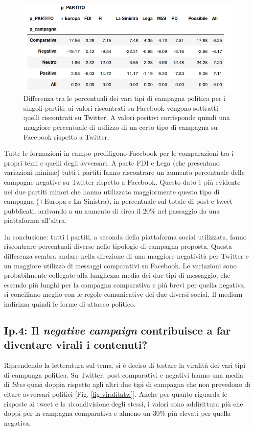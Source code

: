 \begin{figure}
	\includegraphics[width=\textwidth]{figures/partitic}
	\caption{Differenza tra le percentuali dei vari tipi di campagna politica per i singoli partiti: ai valori riscontrati su Facebook vengono sottratti quelli riscontrati su Twitter. A valori positivi corrisponde quindi una maggiore percentuale di utilizzo di un certo tipo di campagna su Facebook rispetto a Twitter.}
	\label{fig:partitic}
\end{figure}

Tutte le formazioni in campo prediligono Facebook per le comparazioni tra i propri temi e quelli degli avversari. A parte FDI e Lega (che presentano variazioni minime) tutti i partiti fanno riscontrare un aumento percentuale delle campagne negative su Twitter rispetto a Facebook.  Questo dato è più evidente nei due partiti minori che hanno utilizzato maggiormente questo tipo di campagna (+Europa e La Sinistra), in percentuale sul totale di post e tweet pubblicati, arrivando a un aumento di circa il 20\% nel passaggio da una piattaforma all’altra.

In conclusione: tutti i partiti, a seconda della piattaforma social utilizzata, fanno riscontrare percentuali diverse nelle tipologie di campagna proposta. Questa differenza sembra andare nella direzione di una maggiore negatività per Twitter e un maggiore utilizzo di messaggi comparativi su Facebook.  Le variazioni sono probabilmente collegate alla lunghezza media dei due tipi di messaggio, che essendo più lunghi per la campagna comparativa e più brevi per quella negativa, si conciliano meglio con le regole comunicative dei due diversi social. Il medium indirizza quindi le forme di attacco politico.

\subsection{Ip.4: Il \textit{negative campaign} contribuisce a far diventare virali i contenuti?}
Riprendendo la letteratura sul tema, si è deciso di testare la viralità dei vari tipi di campanga politica. 
Su Twitter, post comparativi e negativi hanno una media di \textit{likes} quasi doppia rispetto agli altri due tipi di campagna che non prevedono di citare avversari politici [Fig. \ref{fig:viralitatw}]. Anche per quanto riguarda le risposte ai tweet e la ricondivisione degli stessi, i valori sono addirittura più che doppi per la campagna comparativa e almeno un 30\% più elevati per quella negativa.

